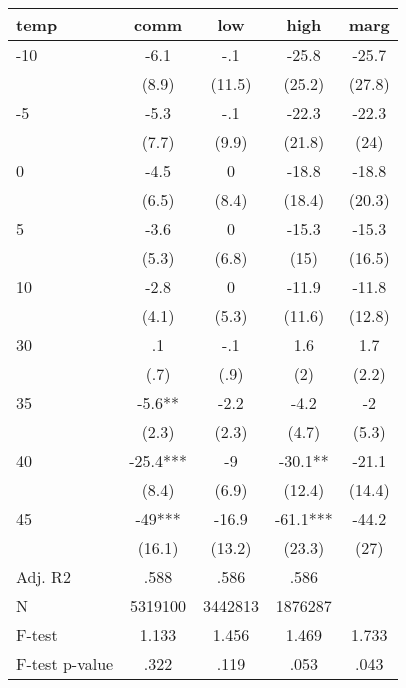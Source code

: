 \documentclass[]{article}
\begin{document}
\begin{tabular}{lcccc} \hline
temp & comm & low & high & marg \\ \hline
-10 & -6.1 & -.1 & -25.8 & -25.7 \\
 & (8.9) & (11.5) & (25.2) & (27.8) \\
-5 & -5.3 & -.1 & -22.3 & -22.3 \\
 & (7.7) & (9.9) & (21.8) & (24) \\
0 & -4.5 & 0 & -18.8 & -18.8 \\
 & (6.5) & (8.4) & (18.4) & (20.3) \\
5 & -3.6 & 0 & -15.3 & -15.3 \\
 & (5.3) & (6.8) & (15) & (16.5) \\
10 & -2.8 & 0 & -11.9 & -11.8 \\
 & (4.1) & (5.3) & (11.6) & (12.8) \\
30 & .1 & -.1 & 1.6 & 1.7 \\
 & (.7) & (.9) & (2) & (2.2) \\
35 & -5.6** & -2.2 & -4.2 & -2 \\
 & (2.3) & (2.3) & (4.7) & (5.3) \\
40 & -25.4*** & -9 & -30.1** & -21.1 \\
 & (8.4) & (6.9) & (12.4) & (14.4) \\
45 & -49*** & -16.9 & -61.1*** & -44.2 \\
 & (16.1) & (13.2) & (23.3) & (27) \\
\hline Adj. R2 & .588 & .586 & .586 &  \\
N & 5319100 & 3442813 & 1876287 &  \\
F-test & 1.133 & 1.456 & 1.469 & 1.733 \\
 F-test p-value & .322 & .119 & .053 & .043 \\ \hline
\end{tabular}
\end{document}
